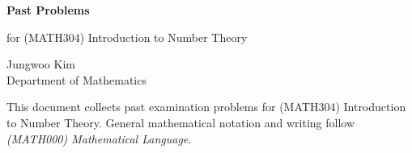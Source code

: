 \documentclass[11pt,oneside]{article}
\begin{document}
\thispagestyle{empty}

\begin{center}
    \vspace*{1.1cm}

    {\LARGE\bfseries Past Problems\par}

    \vspace{0.25cm}

    {\large for (MATH304) Introduction to Number Theory\par}

    \vspace{0.75cm}

    {\normalsize
    Jungwoo Kim\\
    Department of Mathematics\\
    \PohangUniversityOfScienceAndTechnology
    \par}
\end{center}

\vspace{0.45cm}

This document collects past examination problems for (MATH304) Introduction to Number Theory. General mathematical notation and writing follow \textit{(MATH000) Mathematical Language}.
\end{document}
